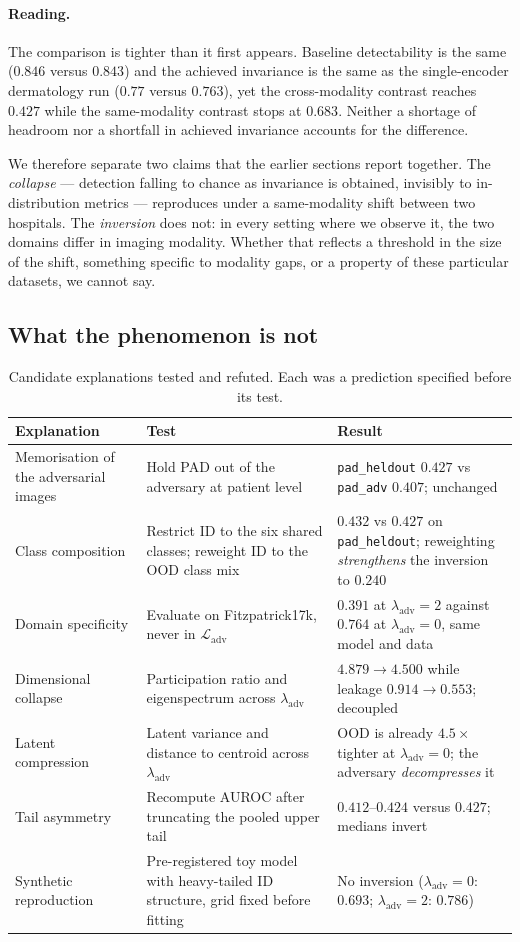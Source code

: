 \documentclass[11pt,a4paper]{article}
\newcommand{\lam}{\lambda_{\mathrm{adv}}}
\begin{document}
\paragraph{Reading.}
The comparison is tighter than it first appears. Baseline detectability is the same
($0.846$ versus $0.843$) and the achieved invariance is the same as the single-encoder
dermatology run ($0.77$ versus $0.763$), yet the cross-modality contrast reaches $0.427$
while the same-modality contrast stops at $0.683$. Neither a shortage of headroom nor a
shortfall in achieved invariance accounts for the difference.

We therefore separate two claims that the earlier sections report together. The
\emph{collapse} --- detection falling to chance as invariance is obtained, invisibly to
in-distribution metrics --- reproduces under a same-modality shift between two
hospitals. The \emph{inversion} does not: in every setting where we observe it, the two
domains differ in imaging modality. Whether that reflects a threshold in the size of the
shift, something specific to modality gaps, or a property of these particular datasets,
we cannot say.

\subsection{What the phenomenon is not}

\begin{table}[t]
\centering
\small
\caption{Candidate explanations tested and refuted. Each was a prediction specified
before its test.}
\label{tab:refuted}
\begin{tabular}{p{3.1cm}p{5.2cm}p{6.1cm}}
\toprule
Explanation & Test & Result \\
\midrule
Memorisation of the adversarial images & Hold PAD out of the adversary at patient level & \texttt{pad\_heldout} $0.427$ vs \texttt{pad\_adv} $0.407$; unchanged \\
Class composition & Restrict ID to the six shared classes; reweight ID to the OOD class mix & $0.432$ vs $0.427$ on \texttt{pad\_heldout}; reweighting \emph{strengthens} the inversion to $0.240$ \\
Domain specificity & Evaluate on Fitzpatrick17k, never in $\mathcal{L}_{\mathrm{adv}}$ & $0.391$ at $\lam = 2$ against $0.764$ at $\lam = 0$, same model and data \\
Dimensional collapse & Participation ratio and eigenspectrum across $\lam$ & $4.879 \to 4.500$ while leakage $0.914 \to 0.553$; decoupled \\
Latent compression & Latent variance and distance to centroid across $\lam$ & OOD is already $4.5\times$ tighter at $\lam = 0$; the adversary \emph{decompresses} it \\
Tail asymmetry & Recompute AUROC after truncating the pooled upper tail & $0.412$--$0.424$ versus $0.427$; medians invert \\
\midrule
Synthetic reproduction & Pre-registered toy model with heavy-tailed ID structure, grid fixed before fitting & No inversion ($\lam{=}0$: $0.693$; $\lam{=}2$: $0.786$) \\
\bottomrule
\end{tabular}
\end{table}
\end{document}
